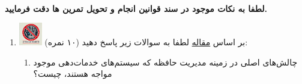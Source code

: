 \documentclass[12pt]{article}
\begin{document}
\fontsize{12pt}{14pt}\selectfont



\\
{\fontsize{14}{22}\selectfont \textbf{لطفا به نکات موجود در سند قوانین انجام و تحویل تمرین ها دقت فرمایید. }}

\begin{enumerate}

    \section*{سوالات تئوری}
    \item \includegraphics[width=1cm]{figs/Forbidden_AI.jpg}
    بر اساس \href{https://arxiv.org/abs/2309.06180}{ مقاله} لطفا به سوالات زیر پاسخ دهید (۱۰ نمره):
    \begin{enumerate}
        \item چالش‌های اصلی در زمینه مدیریت حافظه که سیستم‌های خدمات‌دهی  موجود مواجه هستند، چیست؟
        

\end{enumerate}
\end{enumerate}
\end{document}
